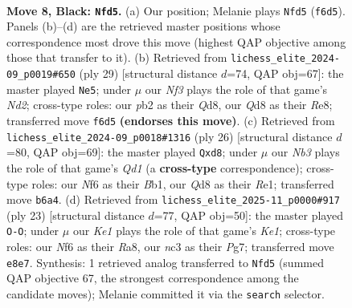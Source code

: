 \documentclass[11pt]{article}
\begin{document}
\begin{figure}[p]\centering
\begin{subfigure}{0.46\textwidth}\centering
\resizebox{\linewidth}{!}{%
\newchessgame
\chessboard[
  setfen={r1bqkb1r/pp3ppp/1np1pn2/4N3/2BP4/2N1P3/PP3PPP/R1BQK2R b KQkq - 2 8},
  showmover=false,
  pgfstyle=straightmove, color=movearrow, markmove={f6-d5}
]}
\caption{}
\end{subfigure}\hfill
\begin{subfigure}{0.46\textwidth}\centering
\resizebox{\linewidth}{!}{%
\newchessgame
\chessboard[
  setfen={r1bqr1k1/1p1n1pb1/2pp2pp/p1n5/2PNP3/2N1B1PP/PPQ2PB1/R3R1K1 b - - 3 15},
  showmover=false,
  pgfstyle=straightmove, color=movearrow, markmove={d7-e5}
]}
\caption{}
\end{subfigure}
\\[4pt]
\begin{subfigure}{0.46\textwidth}\centering
\resizebox{\linewidth}{!}{%
\newchessgame
\chessboard[
  setfen={r1bqr1k1/pp3pp1/1bn4p/4p3/5n2/2P2NN1/PP3PPP/RBBQR1K1 w - - 4 14},
  showmover=false,
  pgfstyle=straightmove, color=movearrow, markmove={d1-d8}
]}
\caption{}
\end{subfigure}\hfill
\begin{subfigure}{0.46\textwidth}\centering
\resizebox{\linewidth}{!}{%
\newchessgame
\chessboard[
  setfen={r1bqk2r/ppp2pp1/n3pn1p/1N1P4/1bP4B/3B1N2/PP3PPP/R2Q1K1R b kq - 1 12},
  showmover=false,
  pgfstyle=straightmove, color=movearrow, markmove={e8-g8}
]}
\caption{}
\end{subfigure}
\caption{\textbf{Move 8, Black: \texttt{Nfd5}.} (a) Our position; Melanie plays \texttt{Nfd5} (\texttt{f6d5}). Panels (b)--(d) are the retrieved master positions whose correspondence most drove this move (highest QAP objective among those that transfer to it). (b) Retrieved from \texttt{lichess\_elite\_2024-09\_p0019\#650} (ply 29) [structural distance $d$=74, QAP obj=67]: the master played \texttt{Ne5}; under $\mu$ our \emph{Nf3} plays the role of that game's \emph{Nd2}; cross-type roles: our \emph{p}b2 as their \emph{Q}d8, our \emph{Q}d8 as their \emph{R}e8; transferred move \texttt{f6d5} \textbf{(endorses this move)}. (c) Retrieved from \texttt{lichess\_elite\_2024-09\_p0018\#1316} (ply 26) [structural distance $d$=80, QAP obj=69]: the master played \texttt{Qxd8}; under $\mu$ our \emph{Nb3} plays the role of that game's \emph{Qd1} (a \textbf{cross-type} correspondence); cross-type roles: our \emph{N}f6 as their \emph{B}b1, our \emph{Q}d8 as their \emph{R}e1; transferred move \texttt{b6a4}. (d) Retrieved from \texttt{lichess\_elite\_2025-11\_p0000\#917} (ply 23) [structural distance $d$=77, QAP obj=50]: the master played \texttt{O-O}; under $\mu$ our \emph{Ke1} plays the role of that game's \emph{Ke1}; cross-type roles: our \emph{N}f6 as their \emph{R}a8, our \emph{n}c3 as their \emph{P}g7; transferred move \texttt{e8e7}. Synthesis: 1 retrieved analog transferred to \texttt{Nfd5} (summed QAP objective 67, the strongest correspondence among the candidate moves); Melanie committed it via the \texttt{search} selector.}
\label{fig:thought-m15}
\end{figure}
\end{document}

